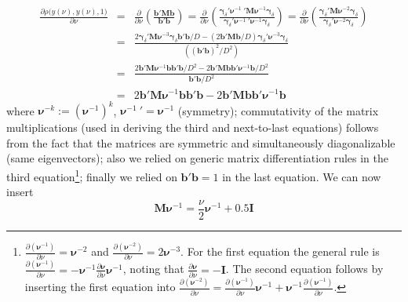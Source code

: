 \documentclass[a4paper]{article}
\begin{document}
\begin{eqnarray}
\frac{\partial\rho\Big(y(\nu),y(\nu),1\Big)}{\partial\nu}&=&\frac{\partial}{\partial\nu}\left(\frac{\mathbf{b}'\mathbf{Mb}}{\mathbf{b}'\mathbf{b}}\right)=\frac{\partial}{\partial\nu}\left(\frac{\boldsymbol{\gamma}_{\delta}'{\boldsymbol{\nu}}^{-1}~'{\mathbf{M}}{\boldsymbol{\nu}}^{-1}\boldsymbol{\gamma}_{\delta}}{\boldsymbol{\gamma}_{\delta}'{\boldsymbol{\nu}}^{-1}~'{\boldsymbol{\nu}}^{-1}\boldsymbol{\gamma}_{\delta}}\right)=\frac{\partial}{\partial\nu}\left(\frac{\boldsymbol{\gamma}_{\delta}'{\mathbf{M}}{\boldsymbol{\nu}}^{-2}\boldsymbol{\gamma}_{\delta}}{\boldsymbol{\gamma}_{\delta}'{\boldsymbol{\nu}}^{-2}\boldsymbol{\gamma}_{\delta}}\right)\nonumber\\
&=&\frac{2\boldsymbol{\gamma}_{\delta}'{\mathbf{M}}{\boldsymbol{\nu}}^{-3}\boldsymbol{\gamma}_{\delta}\mathbf{b'}\mathbf{b}/D-(2\mathbf{b}'{\mathbf{M}}\mathbf{b}/D)\boldsymbol{\gamma}_{\delta}'{\boldsymbol{\nu}}^{-3}\boldsymbol{\gamma}_{\delta}}{( (\mathbf{b}'\mathbf{b})^2/D^2)}\nonumber\\
&=&\frac{2\mathbf{b}'{\mathbf{M}}{\boldsymbol{\nu}}^{-1}\mathbf{b}\mathbf{b'}\mathbf{b}/D^2-2\mathbf{b}'{\mathbf{M}}\mathbf{b}\mathbf{b}'{\boldsymbol{\nu}}^{-1}\mathbf{b}/D^2}{\mathbf{b}'\mathbf{b}/D^2}\nonumber\\
&=&2\mathbf{b}'{\mathbf{M}}{\boldsymbol{\nu}}^{-1}\mathbf{b}\mathbf{b'}\mathbf{b}-2\mathbf{b}'{\mathbf{M}}\mathbf{b}\mathbf{b}'{\boldsymbol{\nu}}^{-1}\mathbf{b}\label{vgrt2}
\end{eqnarray}
where $\boldsymbol{\nu}^{-k}:=(\boldsymbol{\nu}^{-1})^k$, ${\boldsymbol{\nu}}^{-1}~'={\boldsymbol{\nu}}^{-1}$ (symmetry); commutativity of the matrix multiplications (used in deriving the third and next-to-last equations)  follows from the fact that the matrices are symmetric and simultaneously diagonalizable (same eigenvectors); also we relied on generic matrix differentiation rules in the third equation\footnote{$\frac{\partial({\boldsymbol{\nu}}^{-1})}{\partial\nu}={\boldsymbol{\nu}}^{-2}$ and $\frac{\partial({\boldsymbol{\nu}}^{-2})}{\partial\nu}=2{\boldsymbol{\nu}}^{-3}$. For the first equation the general rule is $\frac{\partial(\boldsymbol\nu^{-1})}{\partial\nu}=-\boldsymbol\nu^{-1}\frac{\partial\boldsymbol\nu}{\partial\nu}\boldsymbol\nu^{-1}$, noting that $\frac{\partial\boldsymbol\nu}{\partial\nu}=-\mathbf{I}$. The second equation follows by inserting the first equation into $\frac{\partial(\boldsymbol\nu^{-2})}{\partial\nu}=\frac{\partial(\boldsymbol\nu^{-1})}{\partial\nu}{\boldsymbol{\nu}}^{-1}+{\boldsymbol{\nu}}^{-1}\frac{\partial({\boldsymbol{\nu}}^{-1})}{\partial\nu}$.};  finally we relied on $\mathbf{b}'\mathbf{b}=1$ in the last equation. We can now insert \[{\mathbf{M}}{\boldsymbol{\nu}}^{-1}=\frac{\nu}{2}{\boldsymbol{\nu}}^{-1}+0.5\mathbf{I}\]
\end{document}
